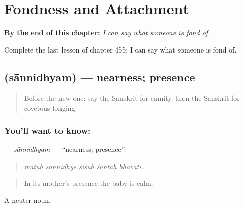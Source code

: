 
\chapter{Fondness and Attachment}
\label{ch:sa-fondness-and-attachment}

\begin{chapteropening}
\textbf{By the end of this chapter:} \emph{I can say what someone is fond of.}

Complete the last lesson of chapter 455: I can say what someone is fond of.
\end{chapteropening}

\section[\texorpdfstring{\sk{सान्निध्यम्} (sānnidhyam)}{सान्निध्यम् (sānnidhyam)}]{ (sānnidhyam) — nearness; presence}

\label{lesson:SA-C455-sannidhyam}



\begin{quote}
Before the new one: say the Sanskrit for enmity, then the Sanskrit for covetous longing.
\end{quote}

\subsection*{You'll want to know: }
\textbf{} — \emph{sānnidhyam} — \textquotedblleft{}nearness; presence\textquotedblright{}.

\begin{quote}
    
\end{quote}

\begin{quote}
\emph{mātuḥ sānnidhye śiśuḥ śāntaḥ bhavati.}
\end{quote}

\begin{quote}
In its mother's presence the baby is calm.
\end{quote}

A neuter noun.

